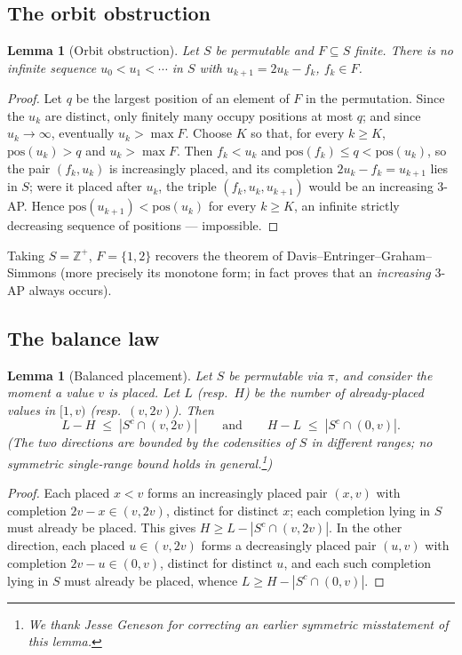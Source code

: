\documentclass[11pt]{article}
\newtheorem{lemma}[theorem]{Lemma}
\theoremstyle{definition}
\newcommand{\Z}{\mathbb{Z}}
\newcommand{\pos}{\mathrm{pos}}
\begin{document}
\subsection{The orbit obstruction}

\begin{lemma}[Orbit obstruction]\label{lem:orbit}
Let $S$ be permutable and $F \subseteq S$ finite. There is no infinite sequence
$u_0 < u_1 < \cdots$ in $S$ with $u_{k+1} = 2u_k - f_k$, $f_k \in F$.
\end{lemma}

\begin{proof}
Let $q$ be the largest position of an element of $F$ in the permutation.
Since the $u_k$ are distinct, only finitely many occupy positions at most
$q$; and since $u_k \to \infty$, eventually $u_k > \max F$. Choose $K$ so
that, for every $k \ge K$, $\pos(u_k) > q$ and $u_k > \max F$. Then
$f_k < u_k$ and $\pos(f_k) \le q < \pos(u_k)$, so the pair $(f_k, u_k)$ is
increasingly placed, and its completion $2u_k - f_k = u_{k+1}$ lies in $S$;
were it placed after $u_k$, the triple $(f_k, u_k, u_{k+1})$ would be an
increasing $3$-AP. Hence $\pos(u_{k+1}) < \pos(u_k)$ for every $k \ge K$,
an infinite strictly decreasing sequence of positions --- impossible.
\end{proof}

Taking $S = \Z^+$, $F = \{1,2\}$ recovers the theorem of Davis--Entringer--Graham--Simmons (more precisely its monotone form; \cite{DEGS77} in fact proves that an \emph{increasing} 3-AP always occurs).

\subsection{The balance law}

\begin{lemma}[Balanced placement]\label{lem:balance}
Let $S$ be permutable via $\pi$, and consider the moment a value $v$ is placed.
Let $L$ (resp.\ $H$) be the number of already-placed values in $[1,v)$ (resp.\
$(v,2v)$). Then
\[
L - H \;\le\; |S^c \cap (v, 2v)|
\qquad\text{and}\qquad
H - L \;\le\; |S^c \cap (0, v)|.
\]
(The two directions are bounded by the codensities of $S$ in \emph{different}
ranges; no symmetric single-range bound holds in general.\footnote{We thank
Jesse Geneson for correcting an earlier symmetric misstatement of this
lemma.})
\end{lemma}

\begin{proof}
Each placed $x < v$ forms an increasingly placed pair $(x,v)$ with completion
$2v - x \in (v, 2v)$, distinct for distinct $x$; each completion lying in $S$
must already be placed. This gives $H \ge L - |S^c \cap (v,2v)|$. In the other
direction, each placed $u \in (v, 2v)$ forms a decreasingly placed pair
$(u,v)$ with completion $2v - u \in (0, v)$, distinct for distinct $u$, and
each such completion lying in $S$ must already be placed, whence
$L \ge H - |S^c \cap (0,v)|$.
\end{proof}
\end{document}
